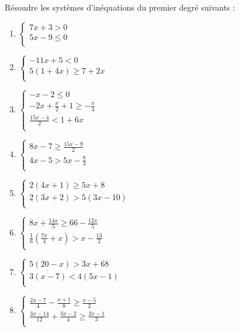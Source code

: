 \begin{exercice}
Résoudre les systèmes d'inéquations du premier degré suivants :
\begin{multicols}{2}
\begin{enumerate}
\item $\left\{ \begin{matrix}
   7x+3>0  \\
   5x-9\le 0  \\
\end{matrix} \right.$
\item $\left\{ \begin{matrix}
   -11x+5<0\,\,\,\,\,\,\,\,\,\,\,  \\
   5\left( 1+4x \right)\ge 7+2x  \\
\end{matrix} \right.$
\item $\left\{ \begin{matrix}
   -x-2\le 0\,\,\,\,\,\,\,\,\,\,\,\,\,\,\,  \\
   -2x+\frac{x}{2}+1\ge -\frac{x}{4}  \\
   \frac{15x-4}{2}<1+6x\,\,\,  \\
\end{matrix} \right.$
\item $\left\{ \begin{matrix}
   8x-7\ge \frac{15x-9}{2}  \\
   4x-5>5x-\frac{8}{3}\,\,  \\
\end{matrix} \right.$
\item $\left\{ \begin{matrix}
   2(4x+1)\ge 5x+8\,\,\,\,\,\,\,\,\,  \\
   2(3x+2)>5(3x-10)  \\
\end{matrix} \right.$
\item $\left\{ \begin{matrix}
   8x+\frac{14x}{5}\ge 66-\frac{12x}{5}  \\
   \frac{1}{6}\left( \frac{7x}{4}+x \right)>x-\frac{13}{2}  \\
\end{matrix} \right.$
\item $\left\{ \begin{matrix}
   5(20-x)>3x+68  \\
   3(x-7)<4(5x-1)  \\
\end{matrix} \right.$
\item $\left\{ \begin{matrix}
   \frac{2x-7}{4}-\frac{x+1}{8}\ge \frac{x-5}{2}\,\,\,\,\,\,\,  \\
   \frac{3x-14}{12}+\frac{3x-2}{4}\ge \frac{2x-1}{3}  \\
\end{matrix} \right.$
\end{enumerate}
\end{multicols}
\end{exercice}
 

